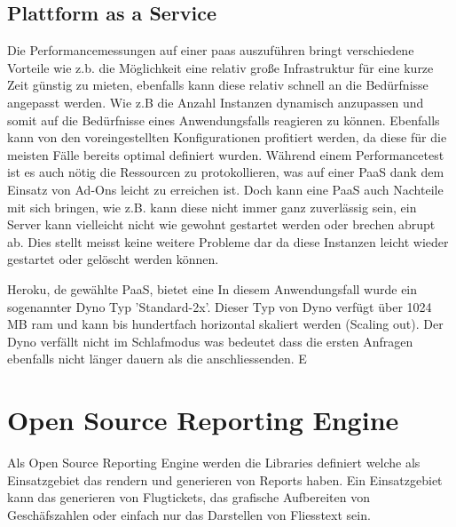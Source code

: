 \documentclass[main.tex]{subfiles}
\begin{document}
\subsection{Plattform as a Service}

Die Performancemessungen auf einer \acrlong{paas} auszuführen bringt verschiedene Vorteile wie z.b. die Möglichkeit eine relativ große Infrastruktur für eine kurze Zeit günstig zu mieten, ebenfalls kann diese relativ schnell an die Bedürfnisse angepasst werden. Wie z.B die Anzahl Instanzen dynamisch anzupassen und somit auf die Bedürfnisse eines Anwendungsfalls reagieren zu können. Ebenfalls kann von den voreingestellten Konfigurationen profitiert werden, da diese für die meisten Fälle bereits optimal definiert wurden. Während einem Performancetest ist es auch nötig die Ressourcen zu protokollieren, was auf einer PaaS dank dem Einsatz von Ad-Ons leicht zu erreichen ist. 
Doch kann eine PaaS auch Nachteile mit sich bringen, wie z.B. kann diese nicht immer ganz  zuverlässig sein, ein Server kann vielleicht nicht wie gewohnt gestartet werden oder brechen abrupt ab. Dies stellt meisst keine weitere Probleme dar da diese Instanzen leicht wieder gestartet oder gelöscht werden können. \cite[Kap.~3]{molyneaux2014art} 


Heroku, de gewählte PaaS, bietet eine 
In diesem Anwendungsfall wurde ein sogenannter Dyno Typ 'Standard-2x'. Dieser Typ von Dyno verfügt über 1024 MB \gls{ram} und kann bis hundertfach horizontal skaliert werden (Scaling out). Der Dyno verfällt nicht im Schlafmodus was bedeutet dass die ersten Anfragen ebenfalls nicht länger dauern als die anschliessenden.
E


\section{Open Source Reporting Engine }



Als Open Source Reporting Engine werden die Libraries definiert welche als Einsatzgebiet das rendern und generieren von Reports haben. Ein Einsatzgebiet kann das generieren von Flugtickets, das grafische Aufbereiten von Geschäfszahlen oder einfach nur das Darstellen von Fliesstext sein.
\end{document}
